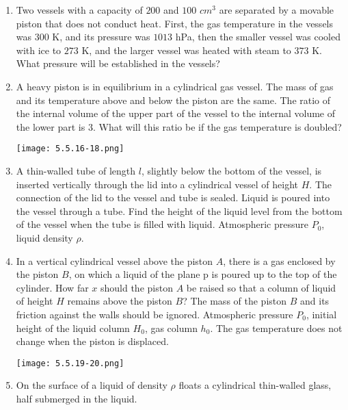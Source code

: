 \documentclass{article}
\begin{document}
\begin{enumerate}[label=5.5.\arabic*]
\item Two vessels with a capacity of $200$ and $100$ $cm^3$ are separated by a movable piston that does not conduct heat. First, the gas temperature in the vessels was $300$ K, and its pressure was $1013$ hPa, then the smaller vessel was cooled with ice to $273$ K, and the larger vessel was heated with steam to $373$ K. What pressure will be established in the vessels?

\item A heavy piston is in equilibrium in a cylindrical gas vessel. The mass of gas and its temperature above and below the piston are the same. The ratio of the internal volume of the upper part of the vessel to the internal volume of the lower part is $3$. What will this ratio be if the gas temperature is doubled?

\begin{center}
    \texttt{[image: 5.5.16-18.png]}
\end{center}


\item A thin-walled tube of length $l$, slightly below the bottom of the vessel, is inserted vertically through the lid into a cylindrical vessel of height $H$. The connection of the lid to the vessel and tube is sealed. Liquid is poured into the vessel through a tube. Find the height of the liquid level from the bottom of the vessel when the tube is filled with liquid. Atmospheric pressure $P_0$, liquid density $\rho$.

\item In a vertical cylindrical vessel above the piston $A$, there is a gas enclosed by the piston $B$, on which a liquid of the plane p is poured up to the top of the cylinder. How far $x$ should the piston $A$ be raised so that a column of liquid of height $H$ remains above the piston $B$? The mass of the piston $B$ and its friction against the walls should be ignored. Atmospheric pressure $P_0$, initial height of the liquid column $H_0$, gas column $h_0$. The gas temperature does not change when the piston is displaced.

\begin{center}
    \texttt{[image: 5.5.19-20.png]}
\end{center}



\item On the surface of a liquid of density $\rho$ floats a cylindrical thin-walled glass, half submerged in the liquid.


\end{enumerate}
\end{document}
